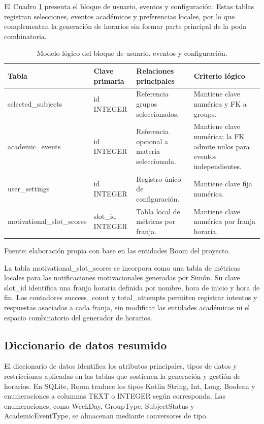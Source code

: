 El Cuadro \ref{tab:f2_modelo_logico_usuario} presenta el bloque de usuario, eventos y configuración. Estas tablas registran selecciones, eventos académicos y preferencias locales, por lo que complementan la generación de horarios sin formar parte principal de la poda combinatoria.

\begin{table}[H]
\centering
\begin{tabularx}{\linewidth}{@{}p{4.2cm} p{2.8cm} p{3.4cm} p{3.8cm}@{}}
\toprule
Tabla & Clave primaria & Relaciones principales & Criterio lógico \\
\midrule
selected\_subjects & id INTEGER & Referencia grupos seleccionados. & Mantiene clave numérica y FK a groups. \\
academic\_events & id INTEGER & Referencia opcional a materia seleccionada. & Mantiene clave numérica; la FK admite nulos para eventos independientes. \\
user\_settings & id INTEGER & Registro único de configuración. & Mantiene clave fija numérica. \\
motivational\_slot\_scores & slot\_id INTEGER & Tabla local de métricas por franja. & Mantiene clave numérica por franja horaria. \\
\bottomrule
\end{tabularx}
\caption{Modelo lógico del bloque de usuario, eventos y configuración.}\label{tab:f2_modelo_logico_usuario}
Fuente: elaboración propia con base en las entidades Room del proyecto.
\end{table}

La tabla motivational\_slot\_scores se incorpora como una tabla de métricas locales para las notificaciones motivacionales generadas por Simón. Su clave slot\_id identifica una franja horaria definida por nombre, hora de inicio y hora de fin. Los contadores success\_count y total\_attempts permiten registrar intentos y respuestas asociadas a cada franja, sin modificar las entidades académicas ni el espacio combinatorio del generador de horarios.

\subsection{Diccionario de datos resumido}
El diccionario de datos identifica los atributos principales, tipos de datos y restricciones aplicadas en las tablas que sostienen la generación y gestión de horarios. En SQLite, Room traduce los tipos Kotlin String, Int, Long, Boolean y enumeraciones a columnas TEXT o INTEGER según corresponda. Las enumeraciones, como WeekDay, GroupType, SubjectStatus y AcademicEventType, se almacenan mediante conversores de tipo.

